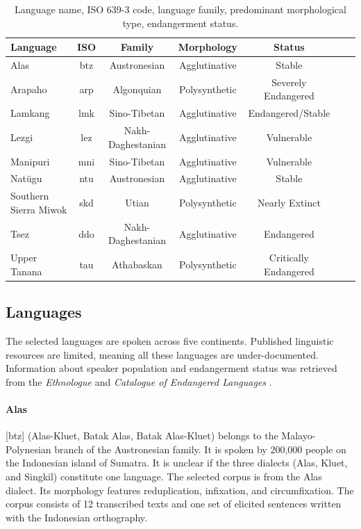 \bgroup
\def\arraystretch{1.25}
\begin{table}[h!]
    \begin{center}
    \begin{tabular}{lcccccc} 
    \textbf{Language} & \textbf{ISO} & \textbf{Family} & \textbf{Morphology} & \textbf{Status} \\
    \hline
    Alas & btz & Austronesian & Agglutinative & Stable \\
    Arapaho & arp & Algonquian & Polysynthetic & Severely Endangered  \\
    Lamkang & lmk & Sino-Tibetan & Agglutinative & Endangered/Stable   \\
    Lezgi & lez & Nakh-Daghestanian & Agglutinative & Vulnerable \\
    Manipuri & mni & Sino-Tibetan & Agglutinative & Vulnerable  \\
    Natügu & ntu & Austronesian & Agglutinative & Stable \\
    Southern Sierra Miwok & skd & Utian & Polysynthetic & Nearly Extinct \\ 
    Tsez & ddo & Nakh-Daghestanian & Agglutinative & Endangered \\
    Upper Tanana & tau & Athabaskan & Polysynthetic & Critically Endangered \\
	\end{tabular}
	\caption[Data]{Language name, ISO 639-3 code, language family, predominant morphological type, endangerment status.}
	\label{tab:langs}
\end{center}
\end{table}


\subsection{Languages} 

The selected languages are spoken across five continents.
Published linguistic resources are limited, meaning all these languages are under-documented. Information about speaker population and endangerment status was retrieved from the \emph{Ethnologue} \citep{eberhard_ethnologue:2020} and \emph{Catalogue of Endangered Languages} \citep{elcat_2020}.

\paragraph{Alas}
[btz] (Alas-Kluet, Batak Alas, Batak Alas-Kluet) belongs to the Malayo-Polynesian branch of the Austronesian family. It is spoken by 200,000 people on the Indonesian island of Sumatra. It is unclear if the three dialects (Alas, Kluet, and Singkil) constitute one language. The selected corpus is from the Alas dialect.  Its morphology features reduplication, infixation, and circumfixation. The corpus consists of 12 transcribed texts and one set of elicited sentences written with the Indonesian orthography. 

